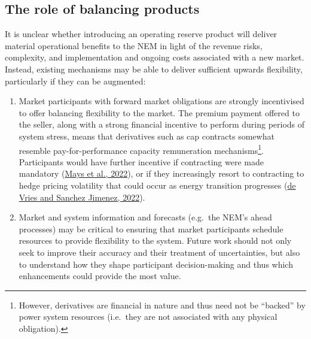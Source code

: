 \documentclass[12pt,a4paper,]{report}
\begin{document}
\hypertarget{the-role-of-balancing-products}{%
\subsection{The role of balancing
products}\label{the-role-of-balancing-products}}

It is unclear whether introducing an operating reserve product will
deliver material operational benefits to the NEM in light of the revenue
risks, complexity, and implementation and ongoing costs associated with
a new market. Instead, existing mechanisms may be able to deliver
sufficient upwards flexibility, particularly if they can be augmented:

\begin{enumerate}
\def\labelenumi{\arabic{enumi}.}
\item
  Market participants with forward market obligations are strongly
  incentivised to offer balancing flexibility to the market. The premium
  payment offered to the seller, along with a strong financial incentive
  to perform during periods of system stress, means that derivatives
  such as cap contracts somewhat resemble pay-for-performance capacity
  remuneration mechanisms\footnote{However, derivatives are financial in
    nature and thus need not be ``backed'' by power system resources
    (i.e.~they are not associated with any physical obligation).}.
  Participants would have further incentive if contracting were made
  mandatory (\protect\hyperlink{ref-maysPrivateRiskSocial2022}{Mays et
  al., 2022}), or if they increasingly resort to contracting to hedge
  pricing volatility that could occur as energy transition progresses
  (\protect\hyperlink{ref-devriesMarketSignalsAdequacy2022}{de Vries and
  Sanchez Jimenez, 2022}).
\item
  Market and system information and forecasts (e.g.~the NEM's ahead
  processes) may be critical to ensuring that market participants
  schedule resources to provide flexibility to the system. Future work
  should not only seek to improve their accuracy and their treatment of
  uncertainties, but also to understand how they shape participant
  decision-making and thus which enhancements could provide the most
  value.
\end{enumerate}
\end{document}
